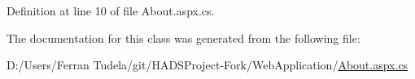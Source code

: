 Definition at line 10 of file About.\+aspx.\+cs.



The documentation for this class was generated from the following file\+:\begin{DoxyCompactItemize}
\item 
D\+:/\+Users/\+Ferran Tudela/git/\+H\+A\+D\+S\+Project-\/\+Fork/\+Web\+Application/\mbox{\hyperlink{About_8aspx_8cs}{About.\+aspx.\+cs}}\end{DoxyCompactItemize}
